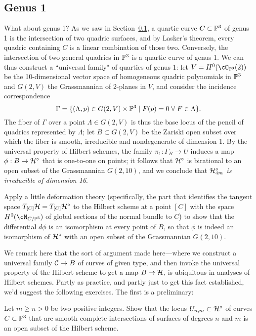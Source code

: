 \subsection{Genus 1}
What about genus 1? As we saw in Section~\ref{}, a quartic curve $C \subset \PP^3$ of genus 1 is the intersection of two quadric surfaces, and by Lasker's theorem, every quadric containing $C$ is a linear combination of those two. Conversely, the intersection of two general quadrics in $\PP^3$ is a quartic curve of genus 1. We can thus construct a ``universal family" of quartics of genus 1: let $V = H^0(\cO_{\PP^3}(2))$ be the 10-dimensional vector space of homogeneous quadric polynomials in $\PP^3$ and $G(2,V)$ the Grassmannian of 2-planes in $V$, and consider the incidence correspondence
$$
\Gamma = \{ (\Lambda, p) \in G(2,V) \times \PP^3 \mid F(p)=0 \; \forall \; F \in \Lambda \}.
$$
The fiber of $\Gamma$ over a point $\Lambda \in G(2,V)$ is thus the base locus of the pencil of quadrics represented by $\Lambda$; let $B \subset G(2,V)$ be the Zariski open subset over which the fiber is smooth, irreducible and nondegenerate of dimension 1. By the universal property of Hilbert schemes, the family $\pi_1 : \Gamma_B \to U$ induces a map $\phi : B \to \cH^\circ$ that is one-to-one on points; it follows that $\cH^\circ$ is birational to an open subset of the Grassmannian $G(2,10)$, and we conclude that \emph{$\cH^\circ_{4m}$ is irreducible of dimension 16}.

\begin{exercise}
Apply a little deformation theory (specifically, the part that identifies the tangent space $T_{[C]}\cH = T_{[C]}\cH^\circ$ to the Hilbert scheme at a point $[C]$ with the space $H^0(\cN_{C/\PP^3})$ of global sections of the normal bundle to $C$)
to show that the differential $d\phi$ is an isomorphism at every point of $B$, so that $\phi$ is indeed an isomorphism of $\cH^\circ$ with an open subset of the Grassmannian $G(2,10)$.
\end{exercise}

We remark here that the sort of argument made here---where we construct a universal family $\cC \to B$ of curves of given type, and then invoke the universal property of the Hilbert scheme to get a map $B \to \cH$, is ubiquitous in analyses of Hilbert schemes. Partly as practice, and partly just to get this fact established, we'd suggest the following exercises. The first is a preliminary:

\begin{exercise}
Let $m \geq n >0$ be two positive integers. Show that the locus $U_{n,m} \subset \cH^\circ$ of curves $C \subset \PP^3$ that are smooth complete intersections of surfaces of degrees $n$ and $m$ is an open subset of the Hilbert scheme.
\end{exercise}

